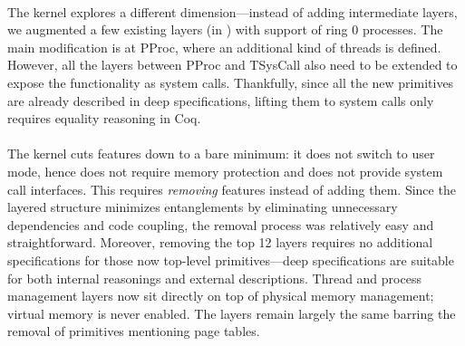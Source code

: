 {%
\paragraph{\mCTOSringz{}}
The \mCTOSringz{} kernel explores a different dimension---instead
of adding intermediate layers, we augmented a few existing layers 
(in \mCTOShyper{}) with support of ring 0 processes.
The main modification is at
\textsf{PProc}, where an additional kind of threads is defined.
However, all the layers between \textsf{PProc} and \textsf{TSysCall} also
need to be extended to expose the functionality as system calls.
Thankfully, since all the new primitives are already described in deep
specifications, lifting them to system calls only requires equality
reasoning in Coq.

\paragraph{\mCTOSembed{}}
The \mCTOSembed{} kernel cuts features down to a bare minimum: it does
not switch to user mode, hence does not require memory protection and
does not provide system call interfaces.  This requires \emph{removing}
features instead of adding them.  Since the layered structure minimizes
entanglements by eliminating unnecessary dependencies and code coupling,
the removal process was relatively easy and straightforward.
Moreover, removing the top 12 layers requires no additional
specifications for those now top-level primitives---deep specifications
are suitable for both internal reasonings and external descriptions.  Thread and process
management layers now sit directly on top of physical memory
management; virtual memory is never enabled.  The
layers remain largely the same barring the removal of primitives
mentioning page tables.}


